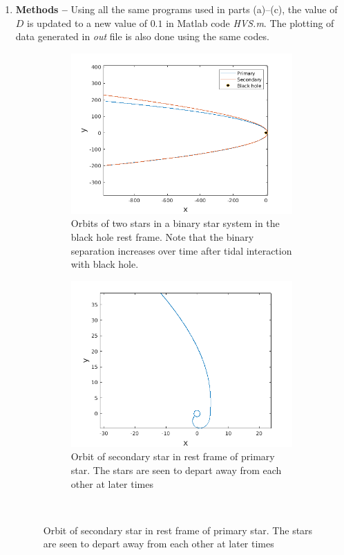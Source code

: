 \documentclass[a4paper]{article}
\begin{document}
\begin{enumerate} [label*=\textbf{(\alph*)}]
			
				\item
					\subitem \textbf{Methods  --}
					Using all the same programs used in parts (a)--(c), the value of \(D\) is updated to a new value of \(0.1\) in Matlab code \emph{HVS.m}. The plotting of data generated in \emph{out} file is also done using the same codes. 
					
					\begin{figure} [h]
						\begin{subfigure} {.5\columnwidth}
							\includegraphics[width=\columnwidth]{../plots/3d_orbitsdisruption_equalaxes.png}
							\caption{Orbits of two stars in a binary star system in the black hole rest frame. Note that the binary separation increases over time after tidal interaction with black hole.}
							\label{fig:3da}
						\end{subfigure}
						\hfill
						\begin{subfigure} {.5\columnwidth}
							\includegraphics[width=\columnwidth]{../plots/3d_secondaryorbitdisruption_equalaxes.png}
							\caption{Orbit of secondary star in rest frame of primary star. The stars are seen to depart away from each other at later times}
							\label{fig:3db}
						\end{subfigure}\\
						

\end{figure}
\end{enumerate}
\end{document}
